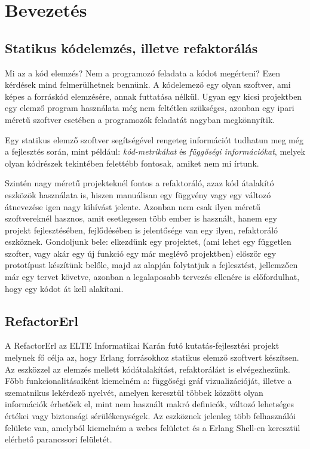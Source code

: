 \chapter{Bevezetés}
\label{ch:intro}

\section{Statikus kódelemzés, illetve refaktorálás}

Mi az a kód elemzés? Nem a programozó feladata a kódot megérteni? Ezen kérdések mind felmerülhetnek bennünk. A kódelemező egy olyan szoftver, ami képes a forráskód elemzésére, annak futtatása nélkül. Ugyan egy kicsi projektben egy elemző program használata még nem feltétlen szükséges, azonban egy ipari méretű szoftver esetében a programozók feladatát nagyban megkönnyítik.

Egy statikus elemző szoftver segítségével rengeteg információt tudhatun meg még a fejlesztés során, mint például: \textit{kód-metrikákat} és \textit{függőségi információkat}, melyek olyan kódrészek tekintében felettébb fontosak, amiket nem mi írtunk.  

Szintén nagy méretű projekteknél fontos a refaktoráló, azaz kód átalakító eszközök használata is, hiszen manuálisan egy függvény vagy egy változó átnevezése igen nagy kihívást jelente. Azonban nem csak ilyen méretű szoftvereknél hasznos, amit esetlegesen több ember is használt, hanem egy projekt fejlesztésében, fejlődésében is jelentősége van egy ilyen, refaktoráló eszköznek. Gondoljunk bele: elkezdünk egy projektet, (ami lehet egy független szofter, vagy akár egy új funkció egy már meglévő projektben) először egy prototípust készítünk belőle, majd az alapján folytatjuk a fejlesztést, jellemzően már egy tervet követve, azonban a legalaposabb tervezés ellenére is előfordulhat, hogy egy kódot át kell alakítani.

\section{RefactorErl}
A RefactorErl az ELTE Informatikai Karán futó kutatás-fejlesztési projekt melynek fő célja az, hogy Erlang forrásokhoz statikus elemző szoftvert készítsen. Az eszközzel az elemzés mellett kódátalakítást, refaktorálást is elvégezhezünk. Főbb funkcionalitásaiként kiemelném a: függőségi gráf vizualizációját, illetve a szematnikus lekérdező nyelvét, amelyen keresztül többek közzött olyan információk érhetőek el, mint nem használt makró definicók, változó lehetséges értékei vagy biztonsági sérülékenységek\cite{refactorerlSecurity}. Az eszköznek jelenleg több felhasználói felülete van, amelyból kiemelném a webes felületet és a Erlang Shell-en keresztül elérhető parancssori felületét.

